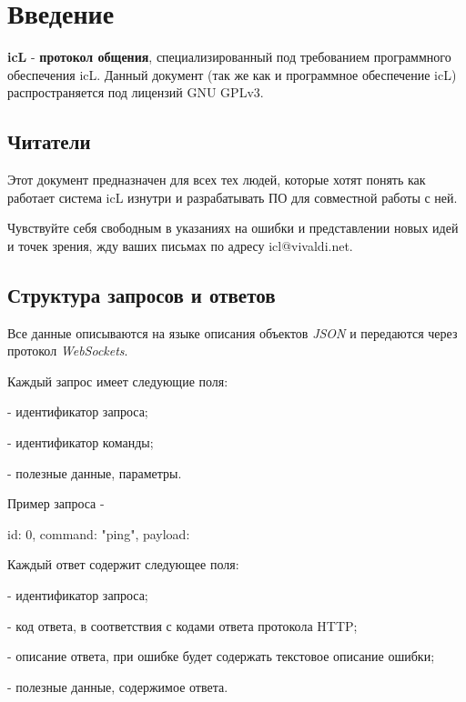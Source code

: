 \section{Введение}

\textbf{icL} - \textbf{протокол общения}, специализированный под требованием программного обеспечения icL. Данный документ (так же как и программное обеспечение icL) распространяется под лицензий GNU GPLv3.

\subsection{Читатели}

Этот документ предназначен для всех тех людей, которые хотят понять как работает система icL изнутри и разрабатывать ПО для совместной работы с ней.

Чувствуйте себя свободным в указаниях на ошибки и представлении новых идей и точек зрения, жду ваших письмах по адресу icl@vivaldi.net.

\subsection{Структура запросов и ответов}

Все данные описываются на языке описания объектов \textit{JSON} и передаются через протокол \textit{WebSockets}.

Каждый запрос имеет следующие поля:
\begin{icItems}
	\item {} - идентификатор запроса;
	\item {} - идентификатор команды;
	\item {} - полезные данные, параметры.
\end{icItems}

Пример запроса -
\begin{jscode}
{
	id: 0,
	command: "ping",
	payload: {}
}
\end{jscode}

Каждый ответ содержит следующее поля:
\begin{icItems}
	\item {} - идентификатор запроса;
	\item {} - код ответа, в соответствия с кодами ответа протокола HTTP;
	\item {} - описание ответа, при ошибке будет содержать текстовое описание ошибки;
	\item {} - полезные данные, содержимое ответа.
\end{icItems}

